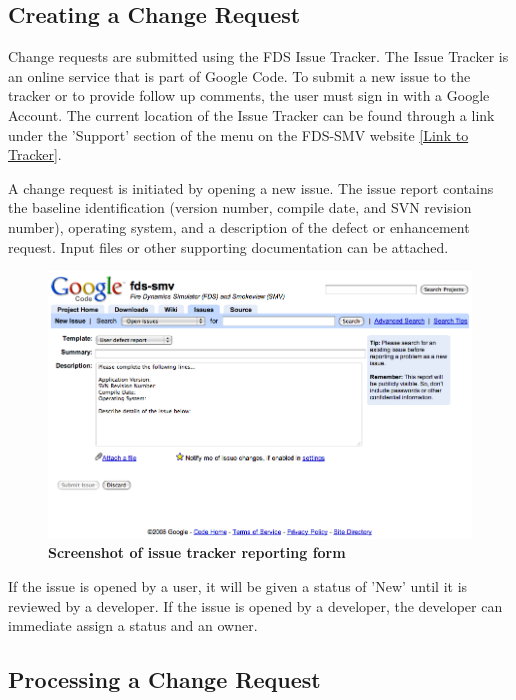 \documentclass[11pt]{book}
\begin{document}
\subsection{Creating a Change Request}

Change requests are submitted using the FDS Issue Tracker.  The Issue Tracker is an online service that is part of
Google Code.  To submit a new issue to the tracker or to provide follow up comments, the user must sign in with a Google Account.
The current location of the Issue Tracker can be found through a link under the 'Support' section of the menu
on the FDS-SMV website \href{http://code.google.com/p/fds-smv/issues/list}{[Link to Tracker]}.

A change request is initiated by opening a new issue.  The issue report contains the baseline identification (version number, compile date, and SVN revision number),
operating system, and a description of the defect or enhancement request.  Input files or other supporting documentation can be attached.

\begin{figure}[ht!]
\includegraphics[width=\textwidth]{FIGURES/NewIssue}
\caption{\bf Screenshot of issue tracker reporting form}
\label{fig:issueform}
\end{figure}

If the issue is opened by a user, it will be given a status of 'New' until it is reviewed by a developer.  If the
issue is opened by a developer, the developer can immediate assign a status and an owner.

\subsection{Processing a Change Request}
\end{document}
